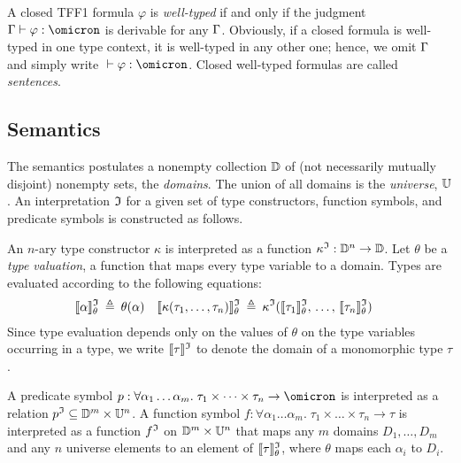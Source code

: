 A closed TFF1 formula $\varphi$ is {\em well-typed\/} if and only if
the judgment $\GAM \vdash \varphi \ty \omicron$ is derivable
for any $\mathrm{\Gamma}$.
Obviously, if a closed formula is
well-typed in one type context, it is well-typed in any other one;
hence, we omit $\mathrm{\Gamma}$ and simply write
${} \vdash \varphi \ty \omicron$.
Closed well-typed formulas are called {\em sentences}.

\subsection{Semantics}

The semantics postulates a nonempty collection $\mathbb{D}$ of (not necessarily mutually disjoint)
nonempty sets, the {\em domains}. The union of all domains is the {\em
universe}, %
$\mathbb{U}$. An interpretation $\mathfrak{I}$ for a given set of type constructors,
function symbols, and predicate symbols is constructed as follows.


An $n$-ary type constructor $\kappa$ is interpreted as a function
$\kappa^{\mathfrak{I}} : \mathbb{D}^n \to \mathbb{D}$.
Let $\theta$ be a {\em type valuation}, a function that maps every
type variable to a domain. Types are evaluated according to the following
equations:
\begin{align*}
\llbracket\alpha\rrbracket^{\mathfrak{I}}_{\theta} &\:\triangleq\: \theta(\alpha) &
\llbracket\kappa(\tau_1,\dots,\tau_n)\rrbracket^{\mathfrak{I}}_{\theta} &\:\triangleq\: \kappa^{\mathfrak{I}}(\llbracket\tau_1\rrbracket^{\mathfrak{I}}_{\theta},\,\dots,\,\llbracket\tau_n\rrbracket^{\mathfrak{I}}_{\theta})
\end{align*}
Since type evaluation depends only on the values of $\theta$
on the type variables occurring in a type, we write $\llbracket\tau\rrbracket^{\mathfrak{I}}$
to denote the domain of a monomorphic type $\tau$.

A predicate symbol $p : \forall \alpha_1\dots\alpha_m .\; \tau_1 \times \dots \times \tau_n
\to \omicron$ is interpreted as a relation
$\smash{p^{\mathfrak{I}}} \subseteq \mathbb{D}^m \times \mathbb{U}^n$.
A function symbol $f : \forall \alpha_1\dots\alpha_m .\; \tau_1 \times \dots \times \tau_n \to \tau$
is interpreted as a function
$f^{\mathfrak{I}}$ on $\mathbb{D}^m \times \mathbb{U}^n$ that
maps any $m$ domains $D_1,\dots,D_m$ and
any $n$ universe elements to an element of
$\llbracket\tau\rrbracket^{\mathfrak{I}}_\theta$,
where $\theta$ maps each $\alpha_i$ to $D_i$.

